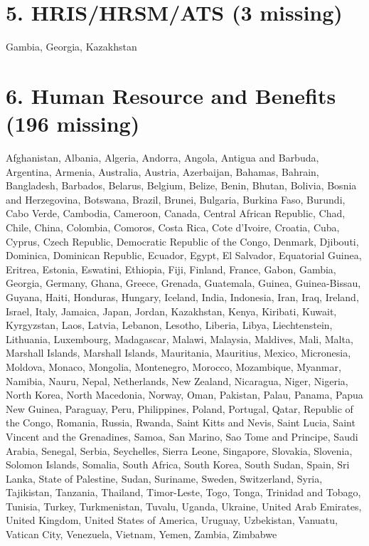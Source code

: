 \documentclass{article}
\begin{document}
\section*{5. HRIS/HRSM/ATS (3 missing)}
Gambia, Georgia, Kazakhstan

\section*{6. Human Resource and Benefits (196 missing)}
Afghanistan, Albania, Algeria, Andorra, Angola, Antigua and Barbuda, Argentina, Armenia, Australia, Austria, Azerbaijan, Bahamas, Bahrain, Bangladesh, Barbados, Belarus, Belgium, Belize, Benin, Bhutan, Bolivia, Bosnia and Herzegovina, Botswana, Brazil, Brunei, Bulgaria, Burkina Faso, Burundi, Cabo Verde, Cambodia, Cameroon, Canada, Central African Republic, Chad, Chile, China, Colombia, Comoros, Costa Rica, Cote d'Ivoire, Croatia, Cuba, Cyprus, Czech Republic, Democratic Republic of the Congo, Denmark, Djibouti, Dominica, Dominican Republic, Ecuador, Egypt, El Salvador, Equatorial Guinea, Eritrea, Estonia, Eswatini, Ethiopia, Fiji, Finland, France, Gabon, Gambia, Georgia, Germany, Ghana, Greece, Grenada, Guatemala, Guinea, Guinea-Bissau, Guyana, Haiti, Honduras, Hungary, Iceland, India, Indonesia, Iran, Iraq, Ireland, Israel, Italy, Jamaica, Japan, Jordan, Kazakhstan, Kenya, Kiribati, Kuwait, Kyrgyzstan, Laos, Latvia, Lebanon, Lesotho, Liberia, Libya, Liechtenstein, Lithuania, Luxembourg, Madagascar, Malawi, Malaysia, Maldives, Mali, Malta, Marshall Islands, Marshall Islands, Mauritania, Mauritius, Mexico, Micronesia, Moldova, Monaco, Mongolia, Montenegro, Morocco, Mozambique, Myanmar, Namibia, Nauru, Nepal, Netherlands, New Zealand, Nicaragua, Niger, Nigeria, North Korea, North Macedonia, Norway, Oman, Pakistan, Palau, Panama, Papua New Guinea, Paraguay, Peru, Philippines, Poland, Portugal, Qatar, Republic of the Congo, Romania, Russia, Rwanda, Saint Kitts and Nevis, Saint Lucia, Saint Vincent and the Grenadines, Samoa, San Marino, Sao Tome and Principe, Saudi Arabia, Senegal, Serbia, Seychelles, Sierra Leone, Singapore, Slovakia, Slovenia, Solomon Islands, Somalia, South Africa, South Korea, South Sudan, Spain, Sri Lanka, State of Palestine, Sudan, Suriname, Sweden, Switzerland, Syria, Tajikistan, Tanzania, Thailand, Timor-Leste, Togo, Tonga, Trinidad and Tobago, Tunisia, Turkey, Turkmenistan, Tuvalu, Uganda, Ukraine, United Arab Emirates, United Kingdom, United States of America, Uruguay, Uzbekistan, Vanuatu, Vatican City, Venezuela, Vietnam, Yemen, Zambia, Zimbabwe
\end{document}
